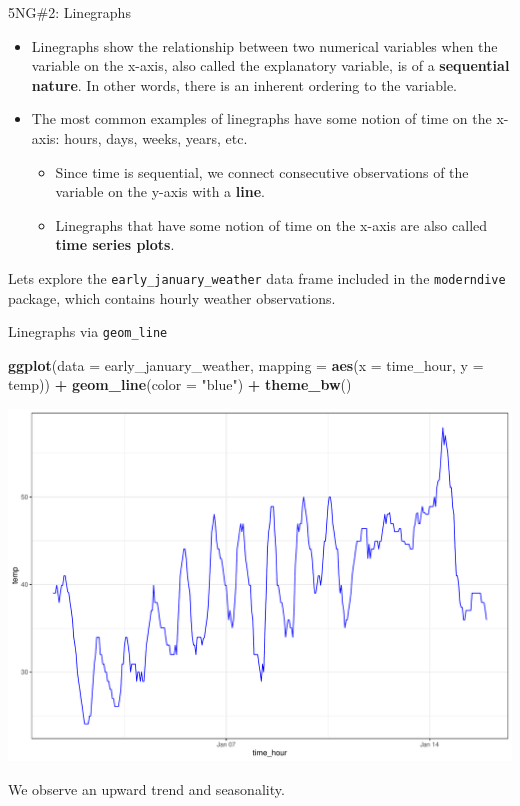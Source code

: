 \documentclass[
  ignorenonframetext,
]{beamer}
\newenvironment{Shaded}{\begin{snugshade}}{\end{snugshade}}
\newcommand{\AttributeTok}[1]{\textcolor[rgb]{0.13,0.29,0.53}{#1}}
\newcommand{\FunctionTok}[1]{\textcolor[rgb]{0.13,0.29,0.53}{\textbf{#1}}}
\newcommand{\NormalTok}[1]{#1}
\newcommand{\SpecialCharTok}[1]{\textcolor[rgb]{0.81,0.36,0.00}{\textbf{#1}}}
\newcommand{\StringTok}[1]{\textcolor[rgb]{0.31,0.60,0.02}{#1}}
\providecommand{\tightlist}{%
  \setlength{\itemsep}{0pt}\setlength{\parskip}{0pt}}
\begin{document}
\begin{frame}[fragile]{5NG\#2: Linegraphs}
\protect\hypertarget{ng2-linegraphs}{}
\begin{itemize}
\item
  Linegraphs show the relationship between two numerical variables when
  the variable on the x-axis, also called the explanatory variable, is
  of a \textbf{sequential nature}. In other words, there is an inherent
  ordering to the variable.
\item
  The most common examples of linegraphs have some notion of time on the
  x-axis: hours, days, weeks, years, etc.

  \begin{itemize}
  \tightlist
  \item
    Since time is sequential, we connect consecutive observations of the
    variable on the y-axis with a \textbf{line}.
  \item
    Linegraphs that have some notion of time on the x-axis are also
    called \textbf{time series plots}.
  \end{itemize}
\end{itemize}

Lets explore the \texttt{early\_january\_weather} data frame included in
the \texttt{moderndive} package, which contains hourly weather
observations.
\end{frame}

\begin{frame}[fragile]{Linegraphs via \texttt{geom\_line}}
\protect\hypertarget{linegraphs-via-geom_line}{}
\tiny

\begin{Shaded}
\begin{Highlighting}[]
\FunctionTok{ggplot}\NormalTok{(}\AttributeTok{data =}\NormalTok{ early\_january\_weather, }
       \AttributeTok{mapping =} \FunctionTok{aes}\NormalTok{(}\AttributeTok{x =}\NormalTok{ time\_hour, }\AttributeTok{y =}\NormalTok{ temp)) }\SpecialCharTok{+}
  \FunctionTok{geom\_line}\NormalTok{(}\AttributeTok{color =} \StringTok{"blue"}\NormalTok{) }\SpecialCharTok{+} 
  \FunctionTok{theme\_bw}\NormalTok{()}
\end{Highlighting}
\end{Shaded}

\begin{center}\includegraphics[width=0.7\linewidth,height=0.5\textheight]{Week2_Lect_files/figure-beamer/unnamed-chunk-24-1} \end{center}
\normalsize

We observe an upward trend and seasonality.
\end{frame}
\end{document}
